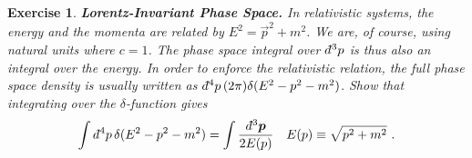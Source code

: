 \documentclass[
  11pt,
	colorful,
	raggedright,
]{tufte-style-thesis-flip}
\newtheorem{exercise}{Exercise}[section]
\renewcommand{\dbar}{d\hspace*{-0.08em}\bar{}\hspace*{0.1em}}
\begin{document}
\begin{exercise}\textbf{Lorentz-Invariant Phase Space.}
In relativistic systems, the energy and the momenta are related by $E^2 = \vec{p}^2 + m^2$. We are, of course, using natural units where $c=1$. The phase space integral over $\dbar^3p$ is thus also an integral over the energy. In order to enforce the relativistic relation, the full phase space density is usually written as $\dbar^4p\, (2\pi)\delta(E^2-p^2-m^2)$. Show that integrating over the $\delta$-function gives
\begin{align}
  \int \dbar^4p\, \delta(E^2-p^2-m^2) &= 
  \int \frac{\dbar^3\vec{p}}{2E(p)}
  &
  E(p) \equiv \sqrt{p^2 + m^2} \ .
\end{align}
\end{exercise}


\cite{BringhurstEoTS} \cite{segrave2009tipping}








\backmatter





\printbibliography
\cleardoublepage
\begin{wide}
\thispagestyle{empty}
\printindex
\end{wide}
\end{document}
